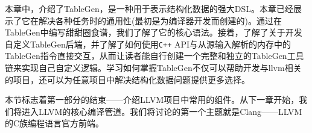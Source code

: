 本章中，介绍了TableGen，是一种用于表示结构化数据的强大DSL。本章已经展示了它在解决各种任务时的通用性(最初是为编译器开发而创建的)。通过在TableGen中编写甜甜圈食谱，我们了解了它的核心语法。接着，了解了关于开发自定义TableGen后端，并了解了如何使用\texttt{C++} API与从源输入解析的内存中的TableGen指令直接交互，从而让读者能自行创建一个完整和独立的TableGen工具链来实现自己自定义逻辑。学习如何掌握TableGen不仅可以帮助开发与llvm相关的项目，还可以为任意项目中解决结构化数据问题提供更多选择。

本节标志着第一部分的结束——介绍LLVM项目中常用的组件。从下一章开始，我们将进入LLVM的核心编译管道。我们将讨论的第一个主题就是Clang——LLVM的C族编程语言官方前端。